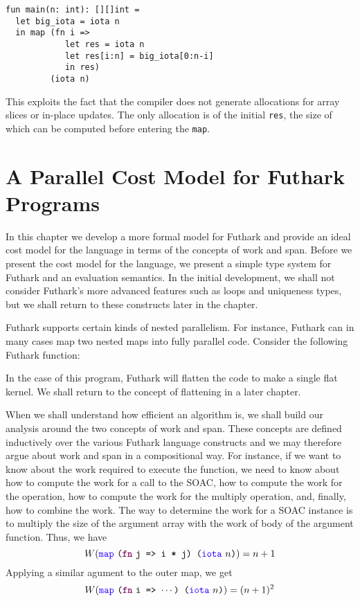\documentclass[oneside,11pt]{book}
\newenvironment{wrap}{\vspace{\topskip}\par\noindent\begin{minipage}{\linewidth}}{\end{minipage}\par}
\begin{document}
\begin{lstlisting}
fun main(n: int): [][]int =
  let big_iota = iota n
  in map (fn i =>
            let res = iota n
            let res[i:n] = big_iota[0:n-i]
            in res)
         (iota n)
\end{lstlisting}

This exploits the fact that the compiler does not generate allocations
for array slices or in-place updates.  The only allocation is of the
initial \texttt{res}, the size of which can be computed before
entering the \texttt{map}.

\chapter{A Parallel Cost Model for Futhark Programs}
\label{chap:costmodel}
In this chapter we develop a more formal model for Futhark and provide
an ideal cost model for the language in terms of the concepts of work
and span. Before we present the cost model for the language, we
present a simple type system for Futhark and an evaluation
semantics. In the initial development, we shall not consider Futhark's
more advanced features such as loops and uniqueness types, but we
shall return to these constructs later in the chapter.

Futhark supports certain kinds of nested parallelism. For instance,
Futhark can in many cases map two nested maps into fully parallel
code. Consider the following Futhark function:

\begin{wrap}

\end{wrap}

\noindent
In the case of this program, Futhark will flatten the code to make a
single flat kernel. We shall return to the concept of flattening in a
later chapter.

When we shall understand how efficient an algorithm is, we shall build
our analysis around the two concepts of work and span. These concepts
are defined inductively over the various Futhark language constructs
and we may therefore argue about work and span in a compositional
way. For instance, if we want to know about the work required to
execute the  function, we need to know about how to
compute the work for a call to the  SOAC, how to compute the
work for the  operation, how to compute the work for the
multiply operation, and, finally, how to combine the work. The way to
determine the work for a  SOAC instance is to multiply the
size of the argument array with the work of body of the argument
function. Thus, we have
$$ W(\fop{map}~\kw{(}\fw{fn}~\kw{j => i * j) (}\fop{iota}~\kw{$n$)}) = n+1 $$
Applying a similar agument to the outer map, we get
$$W(\fop{map}~\kw{(}\fw{fn}~\kw{i => $\cdots$) (}\fop{iota}~\kw{$n$)}) = (n+1)^2 $$
\end{document}

